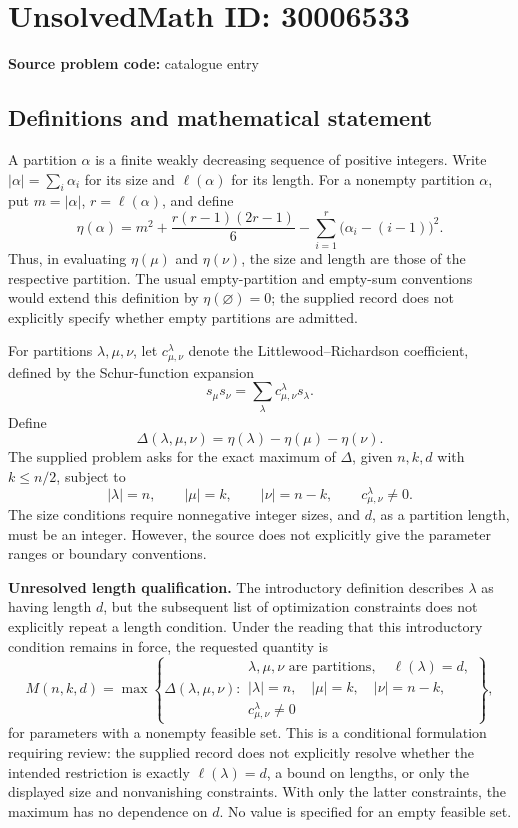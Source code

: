 \documentclass[11pt]{article}
\begin{document}
\section*{UnsolvedMath ID: 30006533}
\textbf{Source problem code:} catalogue entry
\subsection{Definitions and mathematical statement}
A partition \(\alpha\) is a finite weakly decreasing sequence of positive integers. Write \(|\alpha|=\sum_i\alpha_i\) for its size and \(\ell(\alpha)\) for its length. For a nonempty partition \(\alpha\), put \(m=|\alpha|\), \(r=\ell(\alpha)\), and define
\[
\eta(\alpha)=m^2+\frac{r(r-1)(2r-1)}{6}-\sum_{i=1}^{r}\bigl(\alpha_i-(i-1)\bigr)^2.
\]
Thus, in evaluating \(\eta(\mu)\) and \(\eta(\nu)\), the size and length are those of the respective partition. The usual empty-partition and empty-sum conventions would extend this definition by \(\eta(\varnothing)=0\); the supplied record does not explicitly specify whether empty partitions are admitted.

For partitions \(\lambda,\mu,\nu\), let \(c^{\lambda}_{\mu,\nu}\) denote the Littlewood--Richardson coefficient, defined by the Schur-function expansion
\[
s_\mu s_\nu=\sum_\lambda c^{\lambda}_{\mu,\nu}s_\lambda.
\]
Define
\[
\Delta(\lambda,\mu,\nu)=\eta(\lambda)-\eta(\mu)-\eta(\nu).
\]
The supplied problem asks for the exact maximum of \(\Delta\), given \(n,k,d\) with \(k\le n/2\), subject to
\[
|\lambda|=n,\qquad |\mu|=k,\qquad |\nu|=n-k,\qquad c^{\lambda}_{\mu,\nu}\ne0.
\]
The size conditions require nonnegative integer sizes, and \(d\), as a partition length, must be an integer. However, the source does not explicitly give the parameter ranges or boundary conventions.

\textbf{Unresolved length qualification.} The introductory definition describes \(\lambda\) as having length \(d\), but the subsequent list of optimization constraints does not explicitly repeat a length condition. Under the reading that this introductory condition remains in force, the requested quantity is
\[
M(n,k,d)=\max\left\{\Delta(\lambda,\mu,\nu):
\begin{array}{l}
\lambda,\mu,\nu\text{ are partitions},\quad \ell(\lambda)=d,\\
|\lambda|=n,\quad |\mu|=k,\quad |\nu|=n-k,\\
c^{\lambda}_{\mu,\nu}\ne0
\end{array}\right\},
\]
for parameters with a nonempty feasible set. This is a conditional formulation requiring review: the supplied record does not explicitly resolve whether the intended restriction is exactly \(\ell(\lambda)=d\), a bound on lengths, or only the displayed size and nonvanishing constraints. With only the latter constraints, the maximum has no dependence on \(d\). No value is specified for an empty feasible set.
\end{document}
